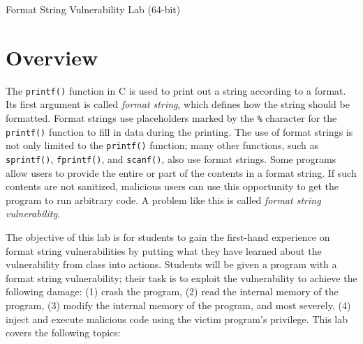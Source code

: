 
\newcommand{\commonfolder}{../../common-files}





\newcommand{\formatFigs}{./Figs}
\newcommand{\dockerfile}{\texttt{Dockerfile}\xspace}







\begin{center}
{\LARGE Format String Vulnerability Lab (64-bit)}
\end{center}





\section{Overview}


The \texttt{printf()} function in C is used to print out a string according to a format.  Its
first argument is called \textit{format string}, which defines how the string should be
formatted. Format strings use placeholders marked by the \texttt{\%} character for the
\texttt{printf()} function to fill in data during the printing.  The use of format strings is
not only limited to the \texttt{printf()} function; many other functions, such as
\texttt{sprintf()}, \texttt{fprintf()}, and \texttt{scanf()}, also use format strings. Some
programs allow users to provide the entire or part of the contents in a format string. If such
contents are not sanitized, malicious users can use this opportunity to get the program to run
arbitrary code. A problem like this is called \textit{format string vulnerability}.


The objective of this lab is for students to gain the first-hand
experience on format string vulnerabilities by putting what they have learned 
about the vulnerability from class into actions. 
Students will be given a program with a format string
vulnerability; their task is to exploit
the vulnerability to achieve the following damage: (1) crash the 
program, (2) read the internal memory of the program, (3) modify
the internal memory of the program, and most severely, 
(4) inject and execute malicious code using the victim program's privilege. 
This lab covers the following topics:

